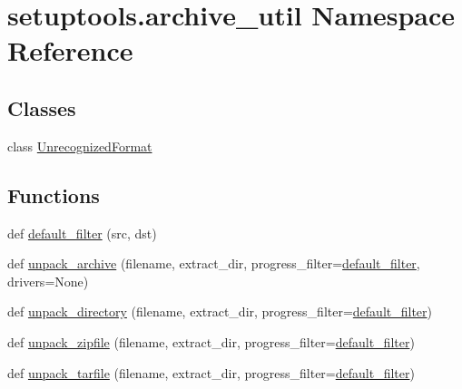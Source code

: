 \hypertarget{namespacesetuptools_1_1archive__util}{}\section{setuptools.\+archive\+\_\+util Namespace Reference}
\label{namespacesetuptools_1_1archive__util}
\subsection*{Classes}
\begin{DoxyCompactItemize}
\item 
class \hyperlink{classsetuptools_1_1archive__util_1_1_unrecognized_format}{Unrecognized\+Format}
\end{DoxyCompactItemize}
\subsection*{Functions}
\begin{DoxyCompactItemize}
\item 
def \hyperlink{namespacesetuptools_1_1archive__util_adede8e93e57be04915ea0d27831b654b}{default\+\_\+filter} (src, dst)
\item 
def \hyperlink{namespacesetuptools_1_1archive__util_a50b89b80cdc264528d20a0b7a7964aa4}{unpack\+\_\+archive} (filename, extract\+\_\+dir, progress\+\_\+filter=\hyperlink{namespacesetuptools_1_1archive__util_adede8e93e57be04915ea0d27831b654b}{default\+\_\+filter}, drivers=None)
\item 
def \hyperlink{namespacesetuptools_1_1archive__util_a6ad75ce90d1cbed27a1d5a1dc6e4dda3}{unpack\+\_\+directory} (filename, extract\+\_\+dir, progress\+\_\+filter=\hyperlink{namespacesetuptools_1_1archive__util_adede8e93e57be04915ea0d27831b654b}{default\+\_\+filter})
\item 
def \hyperlink{namespacesetuptools_1_1archive__util_a01c6de8920234e1bcb47befda68d40c4}{unpack\+\_\+zipfile} (filename, extract\+\_\+dir, progress\+\_\+filter=\hyperlink{namespacesetuptools_1_1archive__util_adede8e93e57be04915ea0d27831b654b}{default\+\_\+filter})
\item 
def \hyperlink{namespacesetuptools_1_1archive__util_aee037d06b845eaf69e229fafccae35b9}{unpack\+\_\+tarfile} (filename, extract\+\_\+dir, progress\+\_\+filter=\hyperlink{namespacesetuptools_1_1archive__util_adede8e93e57be04915ea0d27831b654b}{default\+\_\+filter})
\end{DoxyCompactItemize}
